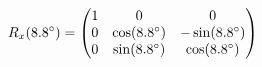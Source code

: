 \documentclass[preview]{standalone}
\begin{document}
\begin{align*}
\special{dvisvgm:raw <g id='unique000'>}R_x(8.8^\circ) = \begin{pmatrix} 1 & 0 & 0 \\ 0 & \cos(8.8^\circ) & -\sin(8.8^\circ) \\ 0 & \sin(8.8^\circ) & \cos(8.8^\circ) \end{pmatrix}\special{dvisvgm:raw </g>}
\end{align*}
\end{document}
